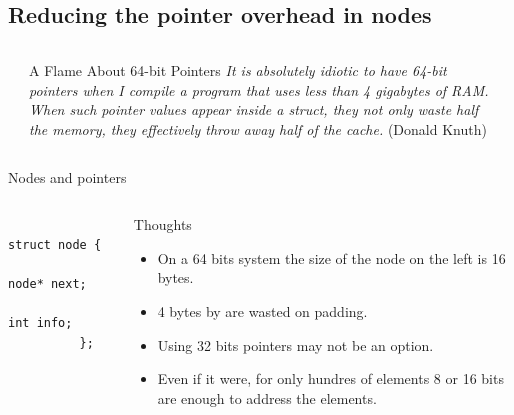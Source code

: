 \documentclass[10pt,aspectratio=169]{beamer}
\begin{document}
\subsection{Reducing the pointer overhead in nodes}

\begin{frame}[fragile]
{}

\begin{columns}
\begin{column}{0.10\textwidth}
\end{column}
\begin{column}{0.80\textwidth}
\begin{block}{A Flame About 64-bit Pointers}
{ \it \noindent
It is absolutely idiotic to have 64-bit pointers when I compile a
program that uses less than 4 gigabytes of RAM. When such pointer
values appear inside a struct, they not only waste half the memory,
they effectively throw away half of the cache.}  \hfill (Donald Knuth)
\end{block}
\end{column}
\begin{column}{0.10\textwidth}
\end{column}
\end{columns}
\end{frame}


\begin{frame}[fragile]{Nodes and pointers}
\begin{columns}
\begin{column}{0.5\textwidth}

\begin{lstlisting}
          struct node {
            node* next;
            int info;
          };
\end{lstlisting}
\end{column}
\begin{column}{0.5\textwidth}
\begin{block}{Thoughts}
\begin{itemize}
\item On a 64 bits system the size of the node on the left is 16 bytes.
\item 4 bytes by are wasted on padding.
\item Using 32 bits pointers may not be an option.
\item Even if it were, for only hundres of elements
8 or 16 bits are enough to address the elements.
\end{itemize}
\end{block}

\end{column}
\end{columns}

\end{frame}
\end{document}
